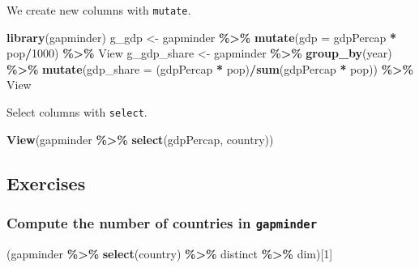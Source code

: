 \documentclass[
]{article}
\newenvironment{Shaded}{\begin{snugshade}}{\end{snugshade}}
\newcommand{\AttributeTok}[1]{\textcolor[rgb]{0.13,0.29,0.53}{#1}}
\newcommand{\DecValTok}[1]{\textcolor[rgb]{0.00,0.00,0.81}{#1}}
\newcommand{\FunctionTok}[1]{\textcolor[rgb]{0.13,0.29,0.53}{\textbf{#1}}}
\newcommand{\NormalTok}[1]{#1}
\newcommand{\OtherTok}[1]{\textcolor[rgb]{0.56,0.35,0.01}{#1}}
\newcommand{\SpecialCharTok}[1]{\textcolor[rgb]{0.81,0.36,0.00}{\textbf{#1}}}
\begin{document}
We create new columns with \texttt{mutate}.

\begin{Shaded}
\begin{Highlighting}[]
\FunctionTok{library}\NormalTok{(gapminder)}
\NormalTok{g\_gdp }\OtherTok{\textless{}{-}}\NormalTok{ gapminder }\SpecialCharTok{\%\textgreater{}\%} \FunctionTok{mutate}\NormalTok{(}\AttributeTok{gdp =}\NormalTok{ gdpPercap }\SpecialCharTok{*}\NormalTok{ pop}\SpecialCharTok{/}\DecValTok{1000}\NormalTok{) }\SpecialCharTok{\%\textgreater{}\%}\NormalTok{ View}
\NormalTok{g\_gdp\_share }\OtherTok{\textless{}{-}}\NormalTok{ gapminder }\SpecialCharTok{\%\textgreater{}\%} \FunctionTok{group\_by}\NormalTok{(year) }\SpecialCharTok{\%\textgreater{}\%} 
  \FunctionTok{mutate}\NormalTok{(}\AttributeTok{gdp\_share =}\NormalTok{ (gdpPercap }\SpecialCharTok{*}\NormalTok{ pop)}\SpecialCharTok{/}\FunctionTok{sum}\NormalTok{(gdpPercap }\SpecialCharTok{*}\NormalTok{ pop)) }\SpecialCharTok{\%\textgreater{}\%}\NormalTok{ View}
\end{Highlighting}
\end{Shaded}

Select columns with \texttt{select}.

\begin{Shaded}
\begin{Highlighting}[]
\FunctionTok{View}\NormalTok{(gapminder }\SpecialCharTok{\%\textgreater{}\%} \FunctionTok{select}\NormalTok{(gdpPercap, country))}
\end{Highlighting}
\end{Shaded}

\hypertarget{exercises}{%
\subsection{Exercises}\label{exercises}}

\hypertarget{compute-the-number-of-countries-in-gapminder}{%
\subsubsection{\texorpdfstring{Compute the number of countries in
\texttt{gapminder}}{Compute the number of countries in gapminder}}\label{compute-the-number-of-countries-in-gapminder}}

\begin{Shaded}
\begin{Highlighting}[]
\NormalTok{(gapminder }\SpecialCharTok{\%\textgreater{}\%} \FunctionTok{select}\NormalTok{(country) }\SpecialCharTok{\%\textgreater{}\%}\NormalTok{ distinct }\SpecialCharTok{\%\textgreater{}\%}\NormalTok{ dim)[}\DecValTok{1}\NormalTok{]}
\end{Highlighting}
\end{Shaded}
\end{document}
